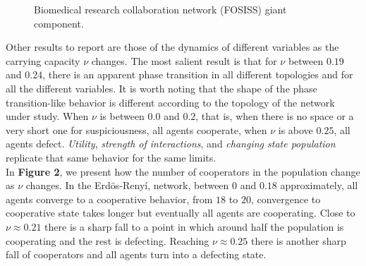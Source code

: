 \documentclass{bmcart}
\def\texttt{[image: ]}
\begin{document}
\begin{figure} [h!]
\centering
\caption{Biomedical research collaboration network (FOSISS) giant component.}\label{Fosiss_GC}
\end{figure}


Other results to report are those of the dynamics of different
variables as the carrying capacity $\nu$ changes. The  most salient
result is that for $\nu$ between $0.19$ and $0.24$, there is an
apparent phase transition in all different topologies and for all the
different variables. It is worth noting that the shape
of the phase transition-like behavior is different according to the topology of the
network under study. When $\nu$ is between $0.0$ and $0.2$, that is, when there is
no space or a very short one for suspiciousness, all agents cooperate, when
$\nu$ is above $0.25$, all agents defect. \textit{Utility},
\textit{strength of interactions}, and \textit{changing state population}
replicate that same behavior for the same limits. \\ 

In \textbf{Figure 2}, we present how the number of cooperators in the population
change as $\nu$ changes. In the Erd\"{o}s-Reny\'i, network, between $0$ and
$0.18$ approximately, all agents converge to a cooperative behavior, from $18$
to $20$, convergence to cooperative state takes longer but eventually all agents
are cooperating. Close to $\nu \approx 0.21$ there is a sharp fall to a point in
which around half the population is cooperating and the rest is
defecting. Reaching $\nu \approx 0.25$ there is another sharp fall of
cooperators and all agents turn into a defecting state.\\
\end{document}
